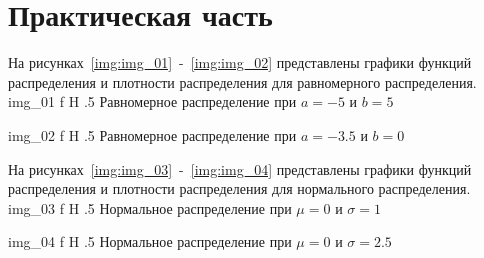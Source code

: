 \chapter{Практическая часть}

На рисунках~\ref{img:img_01}~-~\ref{img:img_02} представлены графики функций распределения и плотности распределения для равномерного распределения.
	{img_01}
	{f}
	{H}
	{.5\textwidth}
	{Равномерное распределение при $a = -5$ и $b = 5$}

	{img_02}
	{f}
	{H}
	{.5\textwidth}
	{Равномерное распределение при $a = -3.5$ и $b = 0$}
	
\newpage

На рисунках~\ref{img:img_03}~-~\ref{img:img_04} представлены графики функций распределения и плотности распределения для нормального распределения.
	{img_03}
	{f}
	{H}
	{.5\textwidth}
	{Нормальное распределение при $\mu = 0$ и $\sigma = 1$}

	{img_04}
	{f}
	{H}
	{.5\textwidth}
	{Нормальное распределение при $\mu = 0$ и $\sigma = 2.5$}
